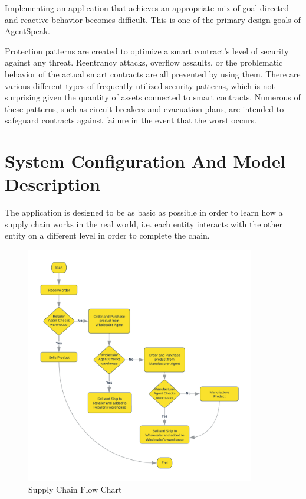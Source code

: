 \begin{description} [style=nextline]
    \vspace{.5cm}
    
    \item[ $\bullet$ Reactiveness]
    Implementing an application that achieves an appropriate mix of goal-directed and reactive behavior becomes difficult. This is one of the primary design goals of AgentSpeak.
    
    \vspace{.5cm}
    
    \item[ $\bullet$ Security]
    Protection patterns are created to optimize a smart contract's level of security against any threat. Reentrancy attacks, overflow assaults, or the problematic behavior of the actual smart contracts are all prevented by using them. There are various different types of frequently utilized security patterns, which is not surprising given the quantity of assets connected to smart contracts. Numerous of these patterns, such as circuit breakers and evacuation plans, are intended to safeguard contracts against failure in the event that the worst occurs.
\end{description}

\section{System Configuration And Model Description}

The application is designed to be as basic as possible in order to learn how a supply chain works in the real world, i.e. each entity interacts with the other entity on a different level in order to complete the chain.

    \begin{figure}[h]
    \centering
      \includegraphics[width=10cm]{includes/figures/Flow Chart.png}
      \caption{Supply Chain Flow Chart}
      \label{Flow chart}
    \end{figure}

